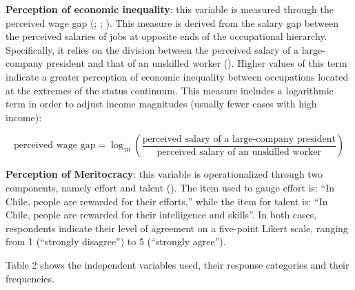 \documentclass[
  12pt,
]{article}
\begin{document}
\textbf{Perception of economic inequality}: this variable is measured
through the perceived wage gap
(;
;
). This measure is derived
from the salary gap between the perceived salaries of jobs at opposite
ends of the occupational hierarchy. Specifically, it relies on the
division between the perceived salary of a large-company president and
that of an unskilled worker (). Higher values of this term indicate a greater perception of
economic inequality between occupations located at the extremes of the
status continuum. This measure includes a logarithmic term in order to
adjust income magnitudes (usually fewer cases with high income):

\[
\text{perceived wage gap} = \log_{10}\left(\frac{\text{perceived salary of a large-company president}}{\text{perceived salary of an unskilled worker}}\right)
\]

\textbf{Perception of Meritocracy}: this variable is operationalized
through two components, namely effort and talent
(). The item used to gauge
effort is: ``In Chile, people are rewarded for their efforts,'' while
the item for talent is: ``In Chile, people are rewarded for their
intelligence and skills''. In both cases, respondents indicate their
level of agreement on a five-point Likert scale, ranging from 1
(``strongly disagree'') to 5 (``strongly agree'').

Table 2 shows the independent variables used, their response categories
and their frequencies.
\end{document}

